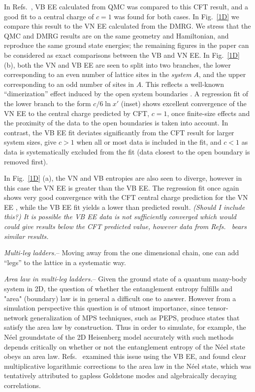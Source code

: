 \documentclass[prl,aps,twocolumn,floatfix,amsmath,amssymb,superscriptaddress,tightenlines]{revtex4}
\begin{document}
In Refs.~\cite{Alet, Chh}, VB EE calculated from QMC was compared to this
CFT result, and a good fit to a central charge of $c=1$ was found for both
cases.  In Fig.~\ref{1D} we compare this result to the VN EE calculated
from the DMRG.  We stress that the QMC and DMRG results are on the same
geometry and Hamiltonian, and reproduce the same ground state energies;
the remaining figures in the paper can be considered as exact comparisons
between the VB and VN EE.  In Fig.~\ref{1D} (b), both the VN and VB EE are
seen to split into two branches, the lower corresponding to an even number
of lattice sites in the {\it system} $A$, and the upper corresponding to
an odd number of sites in $A$.  This reflects a well-known
``dimerization'' effect induced by the open system boundaries \cite{Ian1}.
A regression fit of the lower branch to the form $c/6 \ln {x'}$ (inset)
shows excellent convergence of the VN EE to the central charge predicted
by CFT, $c=1$, once finite-size effects and the proximity of the data to
the open boundaries is taken into account.  In contrast, the VB EE fit
deviates significantly from the CFT result for larger system sizes, give
$c>1$ when all or most data is included in the fit, and $c<1$ as data is
systematically excluded from the fit (data closest to the open boundary is
removed first).

In Fig.~\ref{1D} (a), the VN and VB entropies are also seen to diverge,
however in this case the VN EE is greater than the VB EE.  The regression
fit once again shows very good convergence with the CFT central charge
prediction for the VN EE , while the VB EE fit yields a lower than
predicted result. {\it (Should I include this?) It is possible the VB EE
data is not sufficiently converged which would could give results below
the CFT predicted value, however data from Refs.~\cite{Alet,Chh} bears
similar results. }

{\it Multi-leg ladders.}-- Moving away from the one dimensional chain, one
can add ``legs'' to the lattice in a systematic way.

{\it Area law in multi-leg ladders.}--  Given the ground state of a
quantum many-body system in 2D, the question of whether the entanglement
entropy fulfills and "area" (boundary) law is in general a difficult one
to answer.  However from a simulation perspective this question is of
utmost importance, since tensor-network generalization of MPS techniques,
such as PEPS, produce states that satisfy the area law by construction.
Thus in order to simulate, for example, the N\'eel groundstate of the 2D
Heisenberg model accurately with such methods depends critically on
whether or not the entanglement entropy of the N\'eel state obeys an area
law.  Refs.~\cite{Alet,Chh} examined this issue using the VB EE, and found
clear multiplicative logarithmic corrections to the area law in the N\'eel
state, which was tentatively attributed to gapless Goldstone modes and
algebraically decaying correlations.  
\end{document}
